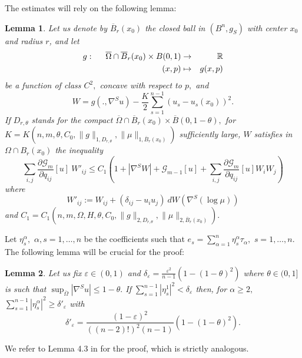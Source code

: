 \documentclass[10pt,reqno,oneside]{amsart}
\newtheorem{lem}{Lemma}[section]
\theoremstyle{definition}
\theoremstyle{remark}
\newcommand{\R}{\mathbb{R}}
\begin{document}
The estimates will rely on the following lemma:
\begin{lem}\label{lem g ineg FijWij}
Let us denote by $\overline{B}_r(x_0)$ the closed ball in $(B^n,g_S)$ with center $x_0$ and radius $r$, and let
\begin{eqnarray*}
g:\hspace{.5cm}\overline{\Omega}\cap \overline{B}_r(x_0)\times B(0,1)&\rightarrow&\R\\
(x,p)&\mapsto & g(x,p)
\end{eqnarray*}
be a function of class $C^2,$ concave with respect to $p,$ and
\begin{equation}\label{def W der sec bord}
W=g(.,\nabla^S u)-\frac{K}{2}\sum_{s=1}^{n-1}(u_s-u_s(x_0))^2.
\end{equation}
If $D_{r,\theta}$ stands for the compact $\overline{\Omega}\cap\overline{B}_r(x_0)\times \overline{B}(0,1-\theta),$ for $K=K(n,m,\theta,C_0,\|g\|_{1,D_{r,\theta}},\|\mu\|_{1,\overline{B}_r(x_0)})$ sufficiently large, $W$ satisfies in $\Omega\cap B_r(x_0)$ the inequality
\begin{equation}\label{ineg FijWij lem}
\sum_{i,j}\frac{\partial\mathcal{G}_m}{\partial q_{ij}}[u]\ W'_{ij}\leq C_1\left(1+|\nabla^S W|+\mathcal{G}_{m-1}[u]+\sum_{i,j}\frac{\partial\mathcal{G}_m}{\partial q_{ij}}[u] W_iW_j\right)
\end{equation}
where
\begin{equation}\label{est C2b def W'ij}
W'_{ij}:=W_{ij}+(\delta_{ij}-u_iu_j)\ dW(\nabla^S(\log\mu))
\end{equation}
and $C_1=C_1(n,m,\Omega,H,\theta,C_0,\|g\|_{2,D_{r,\theta}},\|\mu\|_{2,\overline{B}_r(x_0)}).$
\end{lem}
Let $\eta^{\alpha}_s,$ $\alpha,s=1,\ldots,n$ be the coefficients such that $e_s=\sum_{\alpha=1}^n\eta^{\alpha}_s\tau_\alpha,$ $s=1,\ldots,n.$ The following lemma will be crucial for the proof: 
\begin{lem}\label{lem delta deltap}
Let us fix $\varepsilon\in (0,1)$ and $\delta_{\varepsilon}=\frac{\varepsilon^2}{n-1}(1-(1-\theta)^2)$ where $\theta\in (0,1]$ is such that $\sup_{\overline{\Omega}}|\nabla^S u|\leq 1-\theta.$ If $\sum_{s=1}^{n-1}|\eta^1_s|^2<\delta_{\varepsilon}$ then, for $\alpha\geq 2,$ $\sum_{s=1}^{n-1}|\eta^\alpha_s|^2\geq\delta'_{\varepsilon}$ with
$$\delta'_{\varepsilon}=\frac{(1-\varepsilon)^2}{((n-2)!)^2(n-1)}(1-(1-\theta)^2).$$
\end{lem}
\noindent We refer to Lemma 4.3 in \cite{Bay1} for the proof, which is strictly analogous.
\\
\end{document}
